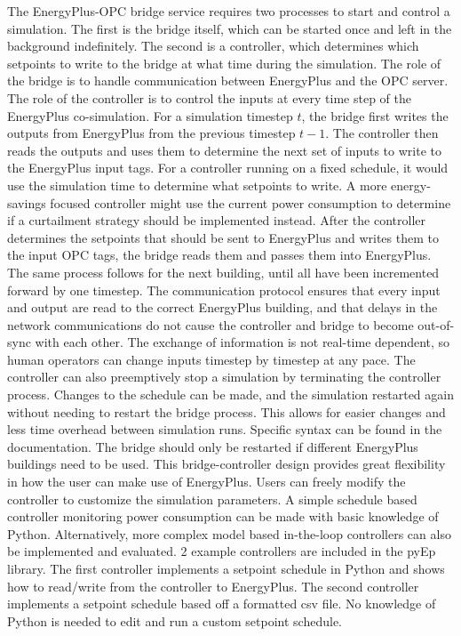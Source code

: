 The EnergyPlus-OPC bridge service requires two processes to start and control a simulation. The first is the bridge itself, which can be started once and left in the background indefinitely. The second is a controller, which determines which setpoints to write to the bridge at what time during the simulation. The role of the bridge is to handle communication between EnergyPlus and the OPC server. The role of the controller is to control the inputs at every time step of the EnergyPlus co-simulation.
For a simulation timestep $t$, the bridge first writes the outputs from EnergyPlus from the previous timestep $t-1$. The controller then reads the outputs and uses them to determine the next set of inputs to write to the EnergyPlus input tags. For a controller running on a fixed schedule, it would use the simulation time to determine what setpoints to write. A more energy-savings focused controller might use the current power consumption to determine if a curtailment strategy should be implemented instead. After the controller determines the setpoints that should be sent to EnergyPlus and writes them to the input OPC tags, the bridge reads them and passes them into EnergyPlus. The same process follows for the next building, until all have been incremented forward by one timestep.
The communication protocol ensures that every input and output are read to the correct EnergyPlus building, and that delays in the network communications do not cause the controller and bridge to become out-of-sync with each other. The exchange of information is not real-time dependent, so human operators can change inputs timestep by timestep at any pace. 
The controller can also preemptively stop a simulation by terminating the controller process. Changes to the schedule can be made, and the simulation restarted again without needing to restart the bridge process. This allows for easier changes and less time overhead between simulation runs. Specific syntax can be found in the documentation. The bridge should only be restarted if different EnergyPlus buildings need to be used.
This bridge-controller design provides great flexibility in how the user can make use of EnergyPlus. Users can freely modify the controller to customize the simulation parameters. A simple schedule based controller monitoring power consumption can be made with basic knowledge of Python. Alternatively, more complex model based in-the-loop controllers can also be implemented and evaluated. 2 example controllers are included in the pyEp library. The first controller implements a setpoint schedule in Python and shows how to read/write from the controller to EnergyPlus. The second controller implements a setpoint schedule based off a formatted csv file. No knowledge of Python is needed to edit and run a custom setpoint schedule.
